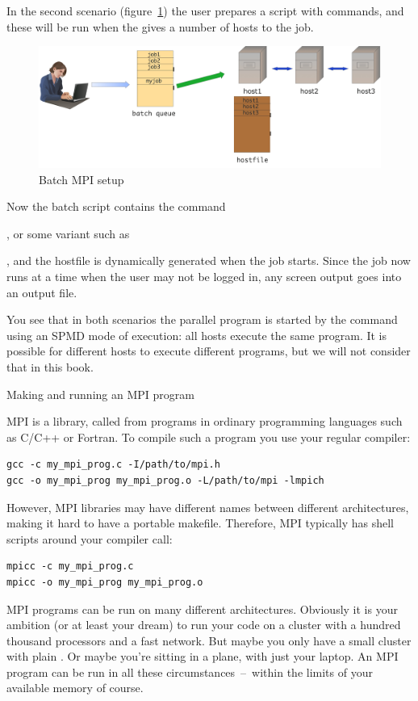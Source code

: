 In the second scenario (figure~\ref{fig:mpi-batch}) the user prepares
a  script with commands, and these will be
run when the  gives a number of hosts
to the job.
\begin{figure}[ht]
  \includegraphics[scale=.1]{graphics/mpi-batch}
  \caption{Batch MPI setup}
  \label{fig:mpi-batch}
\end{figure}
Now the batch script contains the  command%
\begin{istc}
, or some variant such as %
\end{istc}
, and the hostfile is dynamically generated when the job starts.
Since the job now runs at a time when the user may not be logged in, 
any screen output goes into an output file.

You see that in both scenarios the parallel program is started
by the  command using
an \ac{SPMD} mode of execution: all hosts execute the same program.
It is possible for different hosts to execute different programs,
but we will not consider that in this book.

 {Making and running an MPI program}

MPI is a library, called from programs in ordinary programming languages
such as C/C++ or Fortran. To compile such a program you use your regular
compiler:
\begin{verbatim}
gcc -c my_mpi_prog.c -I/path/to/mpi.h
gcc -o my_mpi_prog my_mpi_prog.o -L/path/to/mpi -lmpich
\end{verbatim}
However, MPI libraries may have different names between different
architectures, making it hard to have a portable makefile. Therefore,
MPI typically has shell scripts around your compiler call:
\begin{verbatim}
mpicc -c my_mpi_prog.c
mpicc -o my_mpi_prog my_mpi_prog.o
\end{verbatim}

MPI programs can be run on many different architectures. Obviously it
is your ambition (or at least your dream) to run your code on a
cluster with a hundred thousand processors and a fast network. But
maybe you only have a small cluster with
plain . Or maybe you're sitting in a plane, with
just your laptop. An MPI program can be run in all these
circumstances~--~within the limits of your available memory of course.


